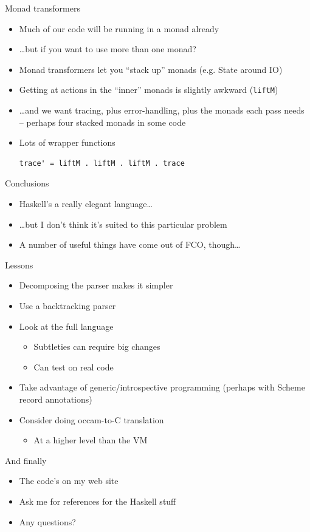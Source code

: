 \documentclass[adam,pdf,slideColor]{prosper}
\begin{document}
\begin{slide}{Monad transformers}
\begin{itemize}
\item Much of our code will be running in a monad already
\item \ldots but if you want to use more than one monad?
\item Monad transformers let you ``stack up'' monads (e.g. State
  around IO)
\item Getting at actions in the ``inner'' monads is slightly awkward
  (\verb|liftM|)
\item \ldots and we want tracing, plus error-handling, plus the monads
  each pass needs -- perhaps four stacked monads in some code
\item Lots of wrapper functions
\begin{verbatim}
trace' = liftM . liftM . liftM . trace
\end{verbatim}
\end{itemize}
\end{slide}

\begin{slide}{Conclusions}
\begin{itemize}
\item Haskell's a really elegant language\ldots
\item \ldots but I don't think it's suited to this particular problem
\item A number of useful things have come out of FCO, though\ldots
\end{itemize}
\end{slide}

\begin{slide}{Lessons}
\begin{itemize}
\item Decomposing the parser makes it simpler
\item Use a backtracking parser
\item Look at the full language
\begin{itemize}
\item Subtleties can require big changes
\item Can test on real code
\end{itemize}
\item Take advantage of generic/introspective programming (perhaps
  with Scheme record annotations)
\item Consider doing occam-to-C translation
\begin{itemize}
\item At a higher level than the VM
\end{itemize}
\end{itemize}
\end{slide}

\begin{slide}{And finally}
\begin{itemize}
\item The code's on my web site
\item Ask me for references for the Haskell stuff
\item Any questions?
\end{itemize}
\end{slide}
\end{document}
